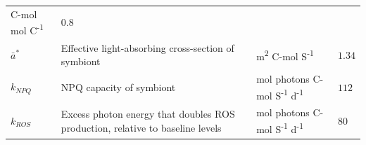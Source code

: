 \documentclass[]{elsarticle} %
\begin{document}
\begin{longtable}[c]{@{}llll@{}}
\begin{minipage}[t]{0.25\columnwidth}
C-mol mol C\textsuperscript{-1}
\strut\end{minipage} &
\begin{minipage}[t]{0.12\columnwidth}\raggedright\strut
\(0.8\)
\strut\end{minipage}\tabularnewline
\begin{minipage}[t]{0.10\columnwidth}\raggedright\strut
\(\bar{a}^*\)
\strut\end{minipage} &
\begin{minipage}[t]{0.45\columnwidth}\raggedright\strut
Effective light-absorbing cross-section of symbiont
\strut\end{minipage} &
\begin{minipage}[t]{0.25\columnwidth}\raggedright\strut
m\textsuperscript{2} C-mol S\textsuperscript{-1}
\strut\end{minipage} &
\begin{minipage}[t]{0.12\columnwidth}\raggedright\strut
\(1.34\)
\strut\end{minipage}\tabularnewline
\begin{minipage}[t]{0.10\columnwidth}\raggedright\strut
\(k_{NPQ}\)
\strut\end{minipage} &
\begin{minipage}[t]{0.45\columnwidth}\raggedright\strut
NPQ capacity of symbiont
\strut\end{minipage} &
\begin{minipage}[t]{0.25\columnwidth}\raggedright\strut
mol photons C-mol S\textsuperscript{-1} d\textsuperscript{-1}
\strut\end{minipage} &
\begin{minipage}[t]{0.12\columnwidth}\raggedright\strut
\(112\)
\strut\end{minipage}\tabularnewline
\begin{minipage}[t]{0.10\columnwidth}\raggedright\strut
\(k_{ROS}\)
\strut\end{minipage} &
\begin{minipage}[t]{0.45\columnwidth}\raggedright\strut
Excess photon energy that doubles ROS production, relative to baseline
levels
\strut\end{minipage} &
\begin{minipage}[t]{0.25\columnwidth}\raggedright\strut
mol photons C-mol S\textsuperscript{-1} d\textsuperscript{-1}
\strut\end{minipage} &
\begin{minipage}[t]{0.12\columnwidth}\raggedright\strut
\(80\)
\strut\end{minipage}\tabularnewline

\end{longtable}
\end{document}
